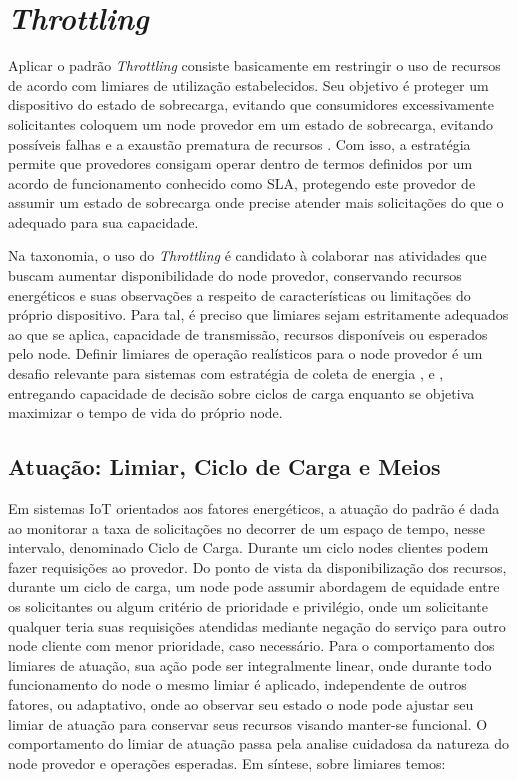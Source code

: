\section{\textit{Throttling}}

Aplicar o padrão \textit{Throttling} consiste basicamente em restringir o uso de recursos de acordo com limiares de utilização estabelecidos. Seu objetivo é proteger um dispositivo do estado de sobrecarga, evitando que consumidores excessivamente solicitantes coloquem um node provedor em um estado de sobrecarga, evitando possíveis falhas e a exaustão prematura de recursos \cite{martinekuan_throttling_nodate}. Com isso, a estratégia permite que provedores consigam operar dentro de termos definidos por um acordo de funcionamento conhecido como \acf{SLA}, protegendo este provedor de assumir um estado de sobrecarga onde precise atender mais solicitações do que o adequado para sua capacidade.

Na taxonomia, o uso do \textit{Throttling} é candidato à colaborar nas atividades que buscam aumentar disponibilidade do node provedor, conservando  recursos energéticos e suas observações a respeito de características ou limitações do próprio dispositivo. Para tal, é preciso que limiares sejam estritamente adequados ao que se aplica, capacidade de transmissão, recursos disponíveis ou esperados pelo node. Definir limiares de operação realísticos para o node provedor é um desafio relevante para sistemas com estratégia de coleta de energia \cite{khairnar_discrete-rate_2015}, \cite{liu_energy_2016} e \cite{zhang_toward_2018}, entregando capacidade de decisão sobre ciclos de carga enquanto se objetiva maximizar o tempo de vida do próprio node.

\subsection{Atuação: Limiar, Ciclo de Carga e Meios}
Em sistemas \acs{IoT} orientados aos fatores energéticos, a atuação do padrão é dada ao monitorar a taxa de solicitações no decorrer de um espaço de tempo, nesse intervalo, denominado Ciclo de Carga. Durante um ciclo nodes clientes podem fazer requisições ao provedor. Do ponto de vista da disponibilização dos recursos, durante um ciclo de carga, um node pode assumir abordagem de equidade entre os solicitantes ou algum critério de prioridade e privilégio, onde um solicitante qualquer teria suas requisições atendidas mediante negação do serviço para outro node cliente com menor prioridade, caso necessário. Para o comportamento dos limiares de atuação, sua ação pode ser integralmente linear, onde durante todo funcionamento do node o mesmo limiar é aplicado, independente de outros fatores, ou adaptativo, onde ao observar seu estado o node pode ajustar seu limiar de atuação para conservar seus recursos visando manter-se funcional. O comportamento do limiar de atuação passa pela analise cuidadosa da natureza do node provedor e operações esperadas. Em síntese, sobre limiares temos:

